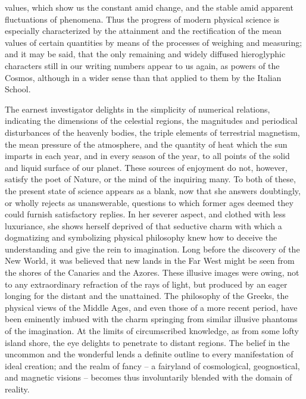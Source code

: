 values, which show us the constant amid change, and the stable amid apparent fluctuations of phenomena. Thus the progress of modern physical science is especially characterized by the attainment and the rectification of the mean values of certain quantities by means of the processes of weighing and measuring; and it may be said, that the only remaining and widely diffused hieroglyphic characters still in our writing numbers appear to us again, as powers of the Cosmos, although in a wider sense than that applied to them by the Italian School.

The earnest investigator delights in the simplicity of numerical relations, indicating the dimensions of the celestial regions, the magnitudes and periodical disturbances of the heavenly bodies, the triple elements of terrestrial magnetism, the mean pressure of the atmosphere, and the quantity of heat which the sun imparts in each year, and in every season of the year, to all points of the solid and liquid surface of our planet. These sources of enjoyment do not, however, satisfy the poet of Nature, or the mind of the inquiring many. To both of these, the present state of science appears as a blank, now that she answers doubtingly, or wholly rejects as unanswerable, questions to which former ages deemed they could furnish satisfactory replies. In her severer aspect, and clothed with less luxuriance, she shows herself deprived of that seductive charm with which a dogmatizing and symbolizing physical philosophy knew how to deceive the understanding and give the rein to imagination. Long before the discovery of the New World, it was believed that new lands in the Far West might be seen from the shores of the Canaries and the Azores. These illusive images were owing, not to any extraordinary refraction of the rays of light, but produced by an eager longing for the distant and the unattained. The philosophy of the Greeks, the physical views of the Middle Ages, and even those of a more recent period, have been eminently imbued with the charm springing from similar illusive phantoms of the imagination. At the limits of circumscribed knowledge, as from some lofty island shore, the eye delights to penetrate to distant regions. The belief in the uncommon and the wonderful lends a definite outline to every manifestation of ideal creation; and the realm of fancy -- a fairyland of cosmological, geognostical, and magnetic visions -- becomes thus involuntarily blended with the domain of reality.


